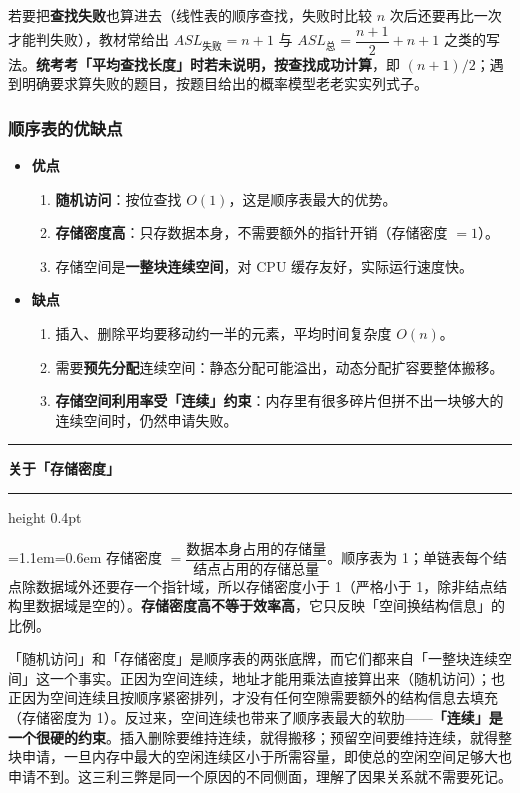 \documentclass[11pt,openany,UTF8]{ctexbook}
\newcommand{\callouthead}[2]{%
  \par\addvspace{7pt}\noindent
  {\color{#1}\rule[-0.15em]{3pt}{1.05em}}\hspace{0.5em}%
  {\bfseries\color{#1}#2}\par\nobreak\vspace{-0.35em}%
  {\color{rulesep}\hrule height 0.4pt}\nobreak\vspace{0.45em}%
  \begingroup\small\setlength{\parindent}{0pt}%
  \leftskip=1.1em\rightskip=0.6em\noindent\ignorespaces}
\newcommand{\calloutend}{\par\endgroup\addvspace{7pt}}
\newenvironment{callwarn}[1]{\callouthead{warnbar}{#1}}{\calloutend}
\begin{document}
若要把\textbf{查找失败}也算进去（线性表的顺序查找，失败时比较 $n$ 次后还要再比一次才能判失败），教材常给出 $ASL_{\text{失败}} = n+1$ 与 $ASL_{\text{总}} = \dfrac{n+1}{2} + n + 1$ 之类的写法。\textbf{统考考「平均查找长度」时若未说明，按查找成功计算}，即 $(n+1)/2$；遇到明确要求算失败的题目，按题目给出的概率模型老老实实列式子。

\subsubsection{顺序表的优缺点}

\begin{itemize}
\item \textbf{优点}
\begin{enumerate}
\item \textbf{随机访问}：按位查找 $O(1)$，这是顺序表最大的优势。
\item \textbf{存储密度高}：只存数据本身，不需要额外的指针开销（存储密度 $=1$）。
\item 存储空间是\textbf{一整块连续空间}，对 CPU 缓存友好，实际运行速度快。
\end{enumerate}
\item \textbf{缺点}
\begin{enumerate}
\item 插入、删除平均要移动约一半的元素，平均时间复杂度 $O(n)$。
\item 需要\textbf{预先分配}连续空间：静态分配可能溢出，动态分配扩容要整体搬移。
\item \textbf{存储空间利用率受「连续」约束}：内存里有很多碎片但拼不出一块够大的连续空间时，仍然申请失败。
\end{enumerate}
\end{itemize}
\begin{callwarn}{关于「存储密度」}
存储密度 $=\dfrac{\text{数据本身占用的存储量}}{\text{结点占用的存储总量}}$。顺序表为 1；单链表每个结点除数据域外还要存一个指针域，所以存储密度小于 1（严格小于 1，除非结点结构里数据域是空的）。\textbf{存储密度高不等于效率高}，它只反映「空间换结构信息」的比例。

\end{callwarn}

「随机访问」和「存储密度」是顺序表的两张底牌，而它们都来自「一整块连续空间」这一个事实。正因为空间连续，地址才能用乘法直接算出来（随机访问）；也正因为空间连续且按顺序紧密排列，才没有任何空隙需要额外的结构信息去填充（存储密度为 1）。反过来，空间连续也带来了顺序表最大的软肋——\textbf{「连续」是一个很硬的约束}。插入删除要维持连续，就得搬移；预留空间要维持连续，就得整块申请，一旦内存中最大的空闲连续区小于所需容量，即使总的空闲空间足够大也申请不到。这三利三弊是同一个原因的不同侧面，理解了因果关系就不需要死记。
\end{document}
